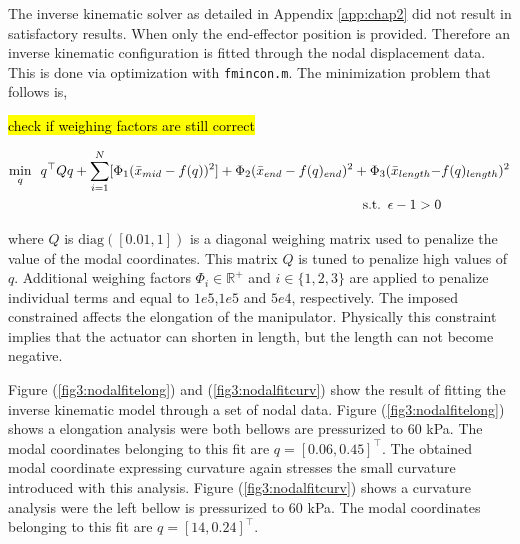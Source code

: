 The inverse kinematic solver as detailed in Appendix \ref{app:chap2} did not result in satisfactory results. When only the end-effector position is provided. Therefore an inverse kinematic configuration is fitted through the nodal displacement data. This is done via optimization with \verb+fmincon.m+. The minimization problem that follows is,

\hl{check if weighing factors are still correct}

\begin{equation}
\begin{aligned}
\min_{q} \hspace{5pt}  q^\top Q q  + \sum_{i=1}^{N}[\Phi_1(\Bar{x}_{mid} - f(q))^2] +   \Phi_2(\Bar{x}_{end}  - f(q)_{end})^2 +  \Phi_3(\Bar{x}_{length} - & f(q)_{length})^2  \\ 
\text{s.t.} \hspace{5pt} \epsilon - 1 > 0
\end{aligned}
\end{equation}


where $Q$ is $\text{diag}([0.01,1])$ is a diagonal weighing matrix used to penalize the value of the modal coordinates. This matrix $Q$ is tuned to penalize high values of $q$.  Additional weighing factors $\Phi_i \in \mathbb{R}^+$ and $i \in \{1,2,3\}$ are applied to penalize individual terms and equal to $1e5$,$1e5$ and $5e4$, respectively. The imposed constrained affects the elongation of the manipulator. Physically this constraint implies that the actuator can shorten in length, but the length can not become negative.

Figure (\ref{fig3:nodalfitelong}) and (\ref{fig3:nodalfitcurv}) show the result of fitting the inverse kinematic model through a set of nodal data. Figure (\ref{fig3:nodalfitelong}) shows a elongation analysis were both bellows are pressurized to 60 kPa. The modal coordinates belonging to this fit are  $q = [0.06, 0.45]^\top$. The obtained modal coordinate expressing curvature again stresses the small curvature introduced with this analysis. Figure (\ref{fig3:nodalfitcurv}) shows a curvature analysis were the left bellow is pressurized to 60 kPa. The modal coordinates belonging to this fit are $q = [14,0.24]^\top$.


